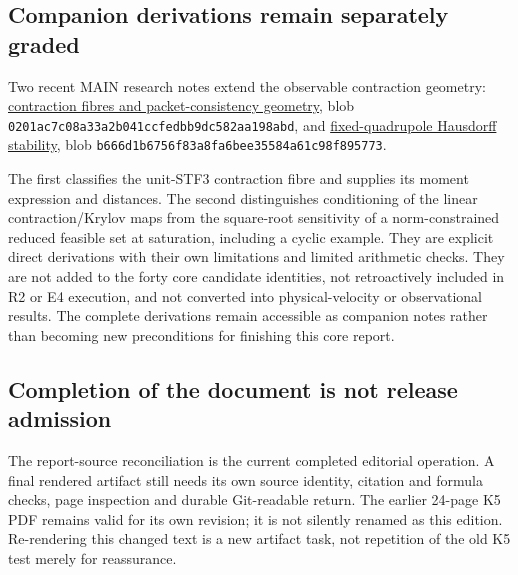 \documentclass[
  11pt,
  a4paper]{article}
\begin{document}
\hypertarget{d.2-companion-derivations-remain-separately-graded}{%
\subsection{Companion derivations remain separately graded}\label{d.2-companion-derivations-remain-separately-graded}}

Two recent MAIN research notes extend the observable contraction geometry: \href{https://github.com/cosmosapjw-quantum/htt_base/blob/d5a5444bab6be7dcc79e362a52811882dd0a66a3/docs/research_reports/notes/QO_CONTRACTION_FIBRE_GEOMETRY_20260907.md}{contraction fibres and packet-consistency geometry}, blob {\ttfamily\nolinkurl{0201ac7c08a33a2b041ccfedbb9dc582aa198abd}}, and \href{https://github.com/cosmosapjw-quantum/htt_base/blob/c09fa9f18f8a6c997f4d7420088653e1cb9af042/docs/research_reports/notes/QO_FIBRE_HAUSDORFF_STABILITY_20260907.md}{fixed-quadrupole Hausdorff stability}, blob {\ttfamily\nolinkurl{b666d1b6756f83a8fa6bee35584a61c98f895773}}.

The first classifies the unit-STF3 contraction fibre and supplies its moment expression and distances. The second distinguishes conditioning of the linear contraction/Krylov maps from the square-root sensitivity of a norm-constrained reduced feasible set at saturation, including a cyclic example. They are explicit direct derivations with their own limitations and limited arithmetic checks. They are not added to the forty core candidate identities, not retroactively included in R2 or E4 execution, and not converted into physical-velocity or observational results. The complete derivations remain accessible as companion notes rather than becoming new preconditions for finishing this core report.

\hypertarget{d.3-completion-of-the-document-is-not-release-admission}{%
\subsection{Completion of the document is not release admission}\label{d.3-completion-of-the-document-is-not-release-admission}}

The report-source reconciliation is the current completed editorial operation. A final rendered artifact still needs its own source identity, citation and formula checks, page inspection and durable Git-readable return. The earlier 24-page K5 PDF remains valid for its own revision; it is not silently renamed as this edition. Re-rendering this changed text is a new artifact task, not repetition of the old K5 test merely for reassurance.
\end{document}

